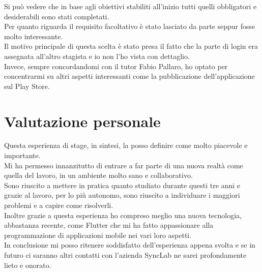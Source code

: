 Si può vedere che in base agli obiettivi stabiliti all'inizio tutti quelli obbligatori e desiderabili sono stati completati.\\
Per quanto riguarda il requisito facoltativo è stato lasciato da parte seppur fosse molto interessante.\\
Il motivo principale di questa scelta è stato presa il fatto che la parte di login era assegnata all'altro stagista e io non l'ho vista con dettaglio.\\
Invece, sempre concordandomi con il tutor Fabio Pallaro, ho optato per concentrarmi su altri aspetti interessanti come la pubblicazione dell'applicazione sul Play Store.


\section{Valutazione personale}
Questa esperienza di stage, in sintesi, la posso definire come molto piacevole e importante.\\
Mi ha permesso innanzitutto di entrare a far parte di una nuova realtà come quella del lavoro, in un ambiente molto sano e collaborativo.\\
Sono riuscito a mettere in pratica quanto studiato durante questi tre anni e grazie al lavoro, per lo più autonomo, sono riuscito a individuare i maggiori problemi e a capire come risolverli.\\
Inoltre grazie a questa esperienza ho compreso meglio una nuova tecnologia, abbastanza recente, come Flutter che mi ha fatto appassionare alla programmazione di applicazioni mobile nei vari loro aspetti.\\
In conclusione mi posso ritenere soddisfatto dell'esperienza appena svolta e se in futuro ci saranno altri contatti con l'azienda SyncLab ne sarei profondamente lieto e onorato.


